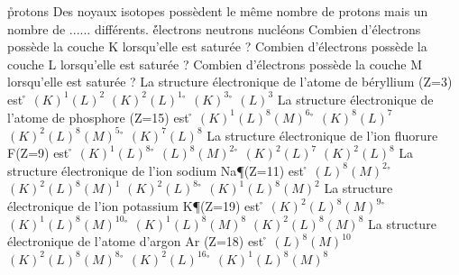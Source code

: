       \r
      protons
 \q
  Des noyaux isotopes possèdent le même nombre de protons mais un nombre de ...... différents.
  \r
  électrons
  \rv
  neutrons
  \rv
  nucléons
 \q
  Combien d'électrons possède la couche K lorsqu'elle est saturée ?
 \q
  Combien d'électrons possède la couche L lorsqu'elle est saturée  ?
 \q
  Combien d'électrons possède la couche M lorsqu'elle est saturée   ?
 \q
  La structure électronique de l'atome de béryllium (Z=3) est
      \r
      $(K)^1(L)^2$
      \rv
      $(K)^2(L)^1 $
      \r
      $(K)^3$
      \r
      $(L)^3$
 \q
  La structure électronique de l'atome de phosphore (Z=15) est
      \r
      $(K)^1(L)^8(M)^6$
      \r
      $(K)^8(L)^7    $
      \rv
      $(K)^2(L)^8(M)^5$
      \r
      $(K)^7(L)^8    $
 \q
  La structure électronique de l'ion fluorure F\M(Z=9) est
      \r
      $(K)^1(L)^8     $
      \r
      $(L)^8(M)^2      $
      \r
      $(K)^2(L)^7      $
      \rv
      $(K)^2(L)^8      $
 \q
  La structure électronique de l'ion sodium Na\P (Z=11) est
      \r
      $(L)^8(M)^2     $
      \r
      $(K)^2(L)^8(M)^1 $
      \rv
      $(K)^2(L)^8     $
      \r
      $(K)^1(L)^8(M)^2 $
 \q
  La structure électronique de l'ion potassium K\P (Z=19) est
      \r
      $(K)^2(L)^8(M)^9$
      \r
      $(K)^1(L)^8(M)^{10}$
      \r
      $(K)^1(L)^8(M)^8 $
      \rv
      $(K)^2(L)^8(M)^8 $
 \q
  La structure électronique de l'atome d'argon Ar (Z=18) est
      \r
      $(L)^8(M)^10  $
      \rv
      $(K)^2(L)^8(M)^8$
      \r
      $(K)^2(L)^{16}$
      \r
      $(K)^1(L)^8(M)^8$
